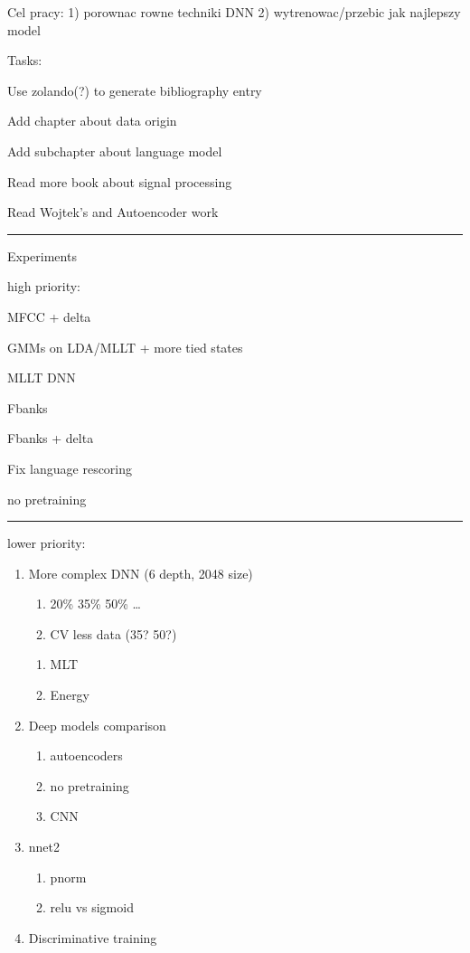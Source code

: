 \documentclass[a4paper]{report}
\theoremstyle{definition}
\theoremstyle{theorem}
\theoremstyle{algorithm}
\begin{document}
\title{}
\author{Piotr Kowenzowski}
\date{\today}
\maketitle
\tableofcontents
\newpage

Cel pracy:
1) porownac rowne techniki DNN
2) wytrenowac/przebic jak najlepszy model 

Tasks:

\begin{enumerate}
{\color{green}
\item Use zolando(?) to generate bibliography entry
\item Add chapter about data origin}
\item Add subchapter about language model
\item Read more book about signal processing
\item Read Wojtek's and Autoencoder work
\end{enumerate}

\rule{\textwidth}{1pt}

Experiments

high priority:

\begin{enumerate}
{\color{green}
\item MFCC + delta
\item GMMs on LDA/MLLT + more tied states
\item MLLT DNN
\item Fbanks
\item Fbanks + delta}
\item Fix language rescoring
\item no pretraining
\end{enumerate}

\rule{\textwidth}{1pt}
lower priority:

\begin{enumerate}
\item More complex DNN (6 depth, 2048 size)  
\begin{enumerate}
\item 20\% 35\% 50\% \ldots
\item CV less data (35? 50?) 
\end{enumerate}
\begin{enumerate}
\item MLT
\item Energy
\end{enumerate}
\item Deep models comparison
\begin{enumerate}
\item autoencoders
\item no pretraining
\item CNN
\end{enumerate}
\item nnet2
\begin{enumerate}
\item pnorm
\item relu vs sigmoid
\end{enumerate}
\item Discriminative training
\end{enumerate}
\end{document}
